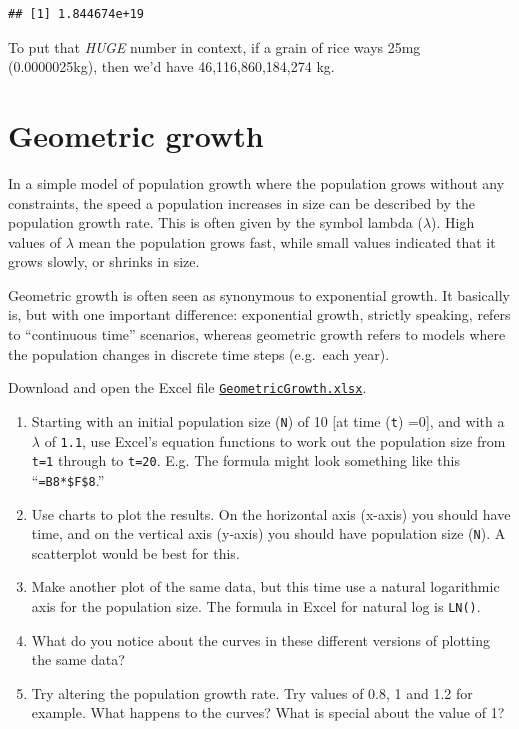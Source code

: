 \documentclass[
  a4paper]{book}
\providecommand{\tightlist}{%
  \setlength{\itemsep}{0pt}\setlength{\parskip}{0pt}}
\begin{document}
\begin{verbatim}
## [1] 1.844674e+19
\end{verbatim}

To put that \emph{HUGE} number in context, if a grain of rice ways 25mg
(0.0000025kg), then we'd have 46,116,860,184,274 kg.

\hypertarget{geometric-growth}{%
\chapter{Geometric growth}\label{geometric-growth}}

In a simple model of population growth where the population grows
without any constraints, the speed a population increases in size can be
described by the population growth rate. This is often given by the
symbol lambda (\(\lambda\)). High values of \(\lambda\) mean the
population grows fast, while small values indicated that it grows
slowly, or shrinks in size.

Geometric growth is often seen as synonymous to exponential growth. It
basically is, but with one important difference: exponential growth,
strictly speaking, refers to ``continuous time'' scenarios, whereas
geometric growth refers to models where the population changes in
discrete time steps (e.g.~each year).

Download and open the Excel file
\href{https://www.dropbox.com/s/xxx05sckvop5i52/GeometricGrowth.xlsx?dl=1}{\texttt{GeometricGrowth.xlsx}}.

\begin{enumerate}
\def\labelenumi{\arabic{enumi}.}
\tightlist
\item
  Starting with an initial population size (\texttt{N}) of 10 {[}at time
  (\texttt{t}) =0{]}, and with a \(\lambda\) of \texttt{1.1}, use
  Excel's equation functions to work out the population size from
  \texttt{t=1} through to \texttt{t=20}. E.g. The formula might look
  something like this ``\texttt{=B8*\$F\$8}.''
\item
  Use charts to plot the results. On the horizontal axis (x-axis) you
  should have time, and on the vertical axis (y-axis) you should have
  population size (\texttt{N}). A scatterplot would be best for this.
\item
  Make another plot of the same data, but this time use a natural
  logarithmic axis for the population size. The formula in Excel for
  natural log is \texttt{LN()}.
\item
  What do you notice about the curves in these different versions of
  plotting the same data?
\item
  Try altering the population growth rate. Try values of 0.8, 1 and 1.2
  for example. What happens to the curves? What is special about the
  value of 1?
\end{enumerate}
\end{document}

